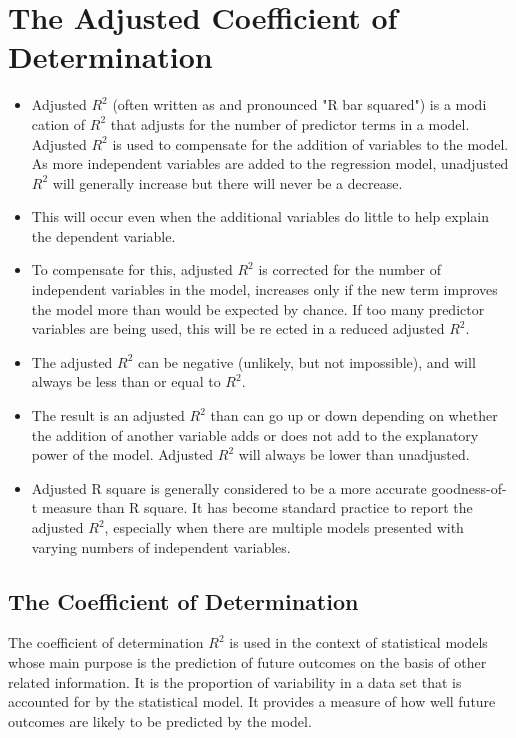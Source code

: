 \documentclass[]{report}
\begin{document}
\section*{The Adjusted Coefficient of Determination}
\begin{itemize}
	\item  Adjusted $R^2$ (often written as and pronounced "R bar squared") is a modi
	cation of $R^2$ that adjusts for the number of predictor terms in a model. Adjusted $R^2$ is used to compensate
	for the addition of variables to the model. As more independent variables are added to the regression
	model, unadjusted $R^2$ will generally increase but there will never be a decrease.
	\item  This will occur even when the additional variables do little to help explain the dependent variable.
	\item  To compensate for this, adjusted $R^2$ is corrected for the number of independent variables in the model,
	increases only if the new term improves the model more than would be expected by chance. If too many
	predictor variables are being used, this will be re
	ected in a reduced adjusted $R^2$.
	\item  The adjusted $R^2$ can be negative (unlikely, but not impossible), and will always be less than or equal to
	$R^2$.
	\item  The result is an adjusted $R^2$ than can go up or down depending on whether the addition of another
	variable adds or does not add to the explanatory power of the model. Adjusted $R^2$ will always be lower
	than unadjusted.
	\item  Adjusted R square is generally considered to be a more accurate goodness-of-
	t measure than R square. It has become standard practice to report the adjusted $R^2$, especially when
	there are multiple models presented with varying numbers of independent variables.
\end{itemize}




\subsection{The Coefficient of Determination}

The coefficient of determination $R^2$ is used in the context of statistical models whose main purpose is the prediction of future outcomes on the basis of other related information. It is the proportion of variability in a data set that is accounted for by the statistical model. It provides a measure of how well future outcomes are likely to be predicted by the model.
\end{document}
